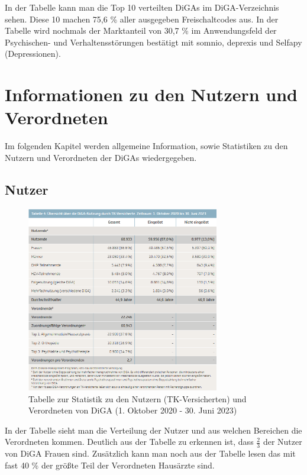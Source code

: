 \documentclass{article}
\begin{document}
			In der Tabelle kann man die Top 10 verteilten DiGAs im DiGA-Verzeichnis sehen. Diese 10 machen 75,6 \% aller ausgegeben Freischaltcodes aus. In der Tabelle wird nochmals der Marktanteil von 30,7 \% im Anwendungsfeld der Psychischen- und Verhaltensstörungen bestätigt mit somnio, deprexis und Selfapy (Depressionen).  
	\newpage
	\section{Informationen zu den Nutzern und Verordneten}
		Im folgenden Kapitel werden allgemeine Information, sowie Statistiken zu den Nutzern und Verordneten der DiGAs wiedergegeben.
		\subsection{Nutzer}
			\begin{figure}[htbp]
				\includegraphics[width=0.75\textwidth]{./grafiken/tabelle_nutzung_versicherte_diga}
				\caption[Statistik zu den Nutzern (TK-Versicherten) und Verordneten von DiGA]{Tabelle zur Statistik zu den Nutzern (TK-Versicherten) und Verordneten von DiGA (1. Oktober 2020 - 30. Juni 2023)}
				\label{Tab-nutzung-versicherte-diga}
			\end{figure}
			In der Tabelle sieht man die Verteilung der Nutzer und aus welchen Bereichen die Verordneten kommen. Deutlich aus der Tabelle zu erkennen ist, dass $\frac{2}{3}$ der Nutzer von DiGA Frauen sind. Zusätzlich kann man noch aus der Tabelle lesen das mit fast 40 \% der größte Teil der Verordneten Hausärzte sind.
			
\end{document}
